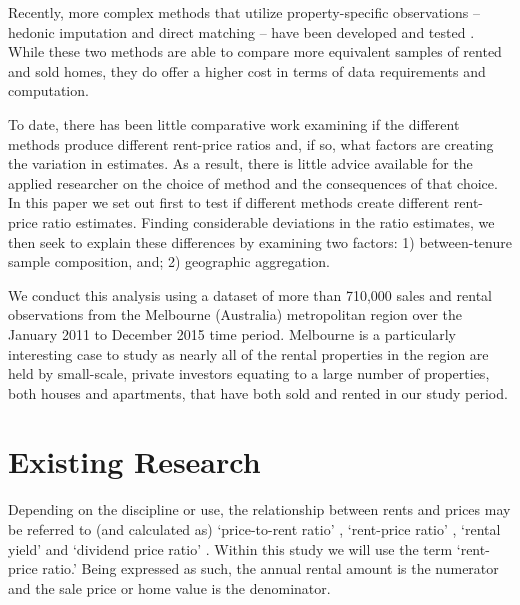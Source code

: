 \documentclass{article}\usepackage[]{graphicx}\usepackage[]{color}
\begin{document}
Recently, more complex methods that utilize property-specific observations -- hedonic imputation and direct matching -- have been developed and tested \citep*{smith2006bubble, hattapoglu2014dependency, bracke2015house, hill2016}. While these two methods are able to compare more equivalent samples of rented and sold homes, they do offer a higher cost in terms of data requirements and computation.\par

To date, there has been little comparative work examining if the different methods produce different rent-price ratios and, if so, what factors are creating the variation in estimates. As a result, there is little advice available for the applied researcher on the choice of method and the consequences of that choice. In this paper we set out first to test if different methods create different rent-price ratio estimates. Finding considerable deviations in the ratio estimates, we then seek to explain these differences by examining two factors: 1) between-tenure sample composition, and; 2) geographic aggregation.\par

We conduct this analysis using a dataset of more than 710,000 sales and rental observations from the Melbourne (Australia) metropolitan region over the January 2011 to December 2015 time period.  Melbourne is a particularly interesting case to study as nearly all of the rental properties in the region are held by small-scale, private investors equating to a large number of properties, both houses and apartments, that have both sold and rented in our study period.\par 

\section*{Existing Research}

Depending on the discipline or use, the relationship between rents and prices may be referred to (and calculated as) `price-to-rent ratio' \citep*{Himmelberg2005, glaeser2007arbitrage, goetzmann2012subprime}, `rent-price ratio' \citep*{Campbell2009, bracke2015house}, `rental yield' \citep*{fu2001market} and `dividend price ratio' \citep*{hwang2006dividend}. Within this study we will use the term `rent-price ratio.' Being expressed as such, the annual rental amount is the numerator and the sale price or home value is the denominator.\par
\end{document}
